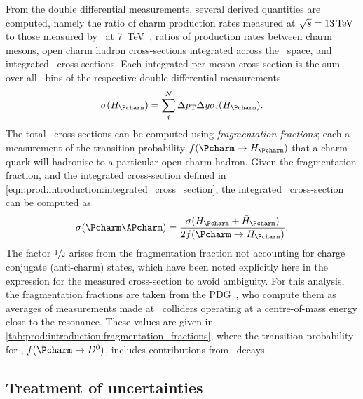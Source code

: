 From the double differential measurements, several derived quantities are 
computed, namely the ratio of charm production rates measured at $\sqrts = 
\SI{13}{\TeV}$ to those measured by \lhcb\ at 
\SI{7}{\TeV}~\cite{LHCb-PAPER-2012-041}, ratios of production rates between 
charm mesons, open charm hadron cross-sections integrated across the \pTy\ 
space, and integrated \ccbar\ cross-sections.
Each integrated per-meson cross-section is the sum over all \pTy\ bins of the 
respective double differential measurements
\begin{equation}
  \xsec{(\PHc)} =
    \sum_{i}^{N} \Delta\pT\Delta\rapidity\xsec_{i}(\PHc).
  \label{eqn:prod:introduction:integrated_cross_section}
\end{equation}
The total \ccbar\ cross-sections can be computed using \emph{fragmentation 
  fractions}; each a measurement of the transition probability $f(\cToHc)$ that 
a charm quark will hadronise to a particular open charm hadron.
Given the fragmentation fraction, and the integrated cross-section defined in 
\cref{eqn:prod:introduction:integrated_cross_section}, the integrated \ccbar\ 
cross-section can be computed as
\begin{equation}
  \xsec{(\ccbar)} = \frac{\xsec(\PHc + \APHc)}{2f(\cToHc)}.
  \label{eqn:prod:introduction:ccbar_cross_section}
\end{equation}
The factor $\sfrac{1}{2}$ arises from the fragmentation fraction not accounting 
for charge conjugate (anti-charm) states, which have been noted explicitly here 
in the expression for the measured cross-section to avoid ambiguity.
For this analysis, the fragmentation fractions are taken from the 
\ac{PDG}~\cite{PDG2008}, who compute them as averages of measurements made at 
\epem\ colliders operating at a centre-of-mass energy close to the 
\PUpsilonFourS resonance.
These values are given in \cref{tab:prod:introduction:fragmentation_fractions}, 
where the transition probability for \PDzero, $f(\decay{\Pcharm}{\PDzero})$, 
includes contributions from \DstToDzpi\ decays.

\begin{table}
  \caption[Charm hadron fragmentation fractions]{%
    Charm hadron fragmentation fractions~\cite{PDG2008}.
    Here, \PHc\ does not include the charge conjugate state.
  }
  \label{tab:prod:introduction:fragmentation_fractions}
  \centering
  
\end{table}

\subsection{Treatment of uncertainties}
\label{chap:prod:introduction:uncertainties}

